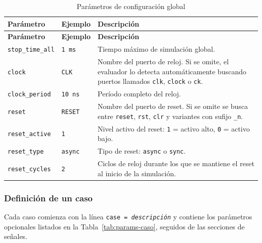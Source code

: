 \documentclass[12pt, a4paper, twoside, openany]{book}
\begin{document}
\begin{longtable}{L{3.6cm} L{3.2cm} L{5.7cm}}
  \caption{Parámetros de configuración global}
  \label{tab:params-global}\\
  \toprule
  \textbf{Parámetro} & \textbf{Ejemplo} & \textbf{Descripción} \\
  \midrule
  \endfirsthead
  \toprule
  \textbf{Parámetro} & \textbf{Ejemplo} & \textbf{Descripción} \\
  \midrule
  \endhead
  \bottomrule
  \endfoot
  \texttt{stop\_time\_all} & \texttt{1 ms} &
    Tiempo máximo de simulación global. \\
  \addlinespace
  \texttt{clock} & \texttt{CLK} &
    Nombre del puerto de reloj. Si se omite, el evaluador lo detecta
    automáticamente buscando puertos llamados \texttt{clk}, \texttt{clock}
    o \texttt{ck}. \\
  \addlinespace
  \texttt{clock\_period} & \texttt{10 ns} &
    Período completo del reloj. \\
  \addlinespace
  \texttt{reset} & \texttt{RESET} &
    Nombre del puerto de reset. Si se omite se busca entre
    \texttt{reset}, \texttt{rst}, \texttt{clr} y variantes con sufijo
    \texttt{\_n}. \\
  \addlinespace
  \texttt{reset\_active} & \texttt{1} &
    Nivel activo del reset: \texttt{1} = activo alto, \texttt{0} = activo
    bajo. \\
  \addlinespace
  \texttt{reset\_type} & \texttt{async} &
    Tipo de reset: \texttt{async} o \texttt{sync}. \\
  \addlinespace
  \texttt{reset\_cycles} & \texttt{2} &
    Ciclos de reloj durante los que se mantiene el reset al inicio de la
    simulación. \\
\end{longtable}

\subsubsection{Definición de un caso}

Cada caso comienza con la línea \texttt{case = \textit{descripción}} y contiene
los parámetros opcionales listados en la Tabla~\ref{tab:params-caso}, seguidos
de las secciones de señales.
\end{document}
